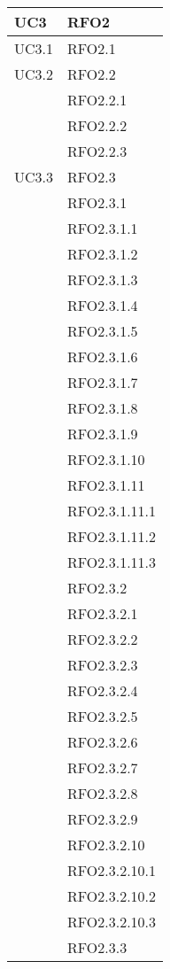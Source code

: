 \begin{center}
\begin{longtable}{ | >{\centering\arraybackslash}m{5cm} | >{\centering\arraybackslash}m{5cm} | }
        UC3 & RFO2\\
\hline

        UC3.1 & RFO2.1\\
\hline

        UC3.2 & RFO2.2\\
            & RFO2.2.1 \\
            & RFO2.2.2 \\
            & RFO2.2.3 \\
\hline

        UC3.3 & RFO2.3\\
            & RFO2.3.1 \\
            & RFO2.3.1.1 \\
            & RFO2.3.1.2 \\
            & RFO2.3.1.3 \\
            & RFO2.3.1.4 \\
            & RFO2.3.1.5 \\
            & RFO2.3.1.6 \\
            & RFO2.3.1.7 \\
            & RFO2.3.1.8 \\
            & RFO2.3.1.9 \\
            & RFO2.3.1.10 \\
            & RFO2.3.1.11 \\
            & RFO2.3.1.11.1 \\
            & RFO2.3.1.11.2 \\
            & RFO2.3.1.11.3 \\
            & RFO2.3.2 \\
            & RFO2.3.2.1 \\
            & RFO2.3.2.2 \\
            & RFO2.3.2.3 \\
            & RFO2.3.2.4 \\
            & RFO2.3.2.5 \\
            & RFO2.3.2.6 \\
            & RFO2.3.2.7 \\
            & RFO2.3.2.8 \\
            & RFO2.3.2.9 \\
            & RFO2.3.2.10 \\
            & RFO2.3.2.10.1 \\
            & RFO2.3.2.10.2 \\
            & RFO2.3.2.10.3 \\
            & RFO2.3.3 \\
\hline


\end{longtable}
\end{center}
